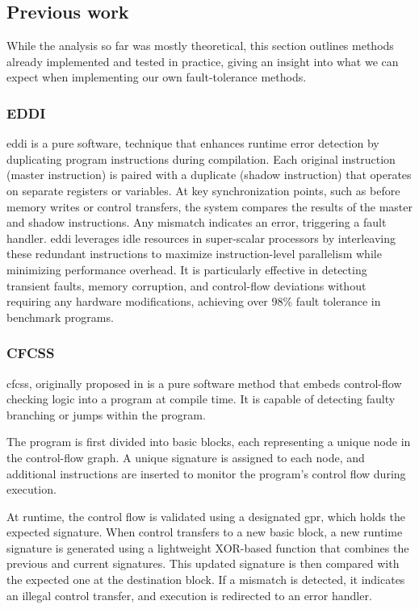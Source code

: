 \subsection{Previous work}

While the analysis so far was mostly theoretical, this section outlines methods already implemented and tested in practice, giving an insight into what we can expect when implementing our own fault-tolerance methods.

\subsubsection{EDDI}

\acrfull{eddi} \cite{eddi} is a pure software, technique that enhances runtime error detection by duplicating program instructions during compilation. Each original instruction (master instruction) is paired with a duplicate (shadow instruction) that operates on separate registers or variables. At key synchronization points, such as before memory writes or control transfers, the system compares the results of the master and shadow instructions. Any mismatch indicates an error, triggering a fault handler. \acrshort{eddi} leverages idle resources in super-scalar processors by interleaving these redundant instructions to maximize instruction-level parallelism while minimizing performance overhead. It is particularly effective in detecting transient faults, memory corruption, and control-flow deviations without requiring any hardware modifications, achieving over 98\% fault tolerance in benchmark programs.


\subsubsection{CFCSS}

\acrfull{cfcss}, originally proposed in \cite{994926} is a pure software method that embeds control-flow checking logic into a program at compile time. It is capable of detecting faulty branching or jumps within the program. 

The program is first divided into basic blocks, each representing a unique node in the control-flow graph. A unique signature is assigned to each node, and additional instructions are inserted to monitor the program's control flow during execution.

At runtime, the control flow is validated using a designated \acrfull{gpr}, which holds the expected signature. When control transfers to a new basic block, a new runtime signature is generated using a lightweight XOR-based function that combines the previous and current signatures. This updated signature is then compared with the expected one at the destination block. If a mismatch is detected, it indicates an illegal control transfer, and execution is redirected to an error handler.

